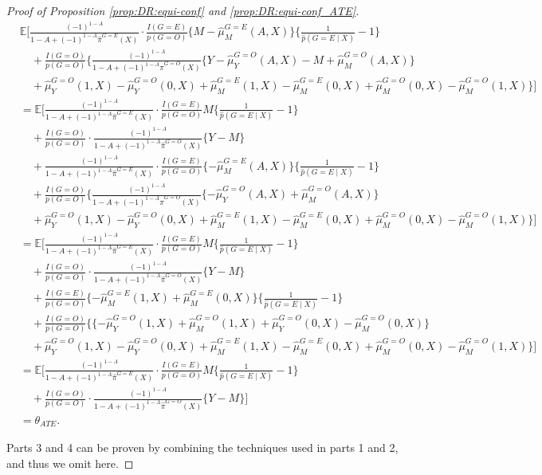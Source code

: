\documentclass[10pt]{article}
\begin{document}
\begin{proof}[Proof of Proposition \ref{prop:DR:equi-conf} and \ref{prop:DR:equi-conf_ATE}]
\begingroup
\allowdisplaybreaks
\begin{align*}
&\mathbb{E}\Big[
\frac{(-1)^{1-A}}{1-A+(-1)^{1-A}\hat{\pi}^{G=E}(X)}\cdot\frac{I(G=E)}{p(G=O)}
\{M-\hat{\mu}^{G=E}_M(A,X)\}\{\frac{1}{\hat{p}(G=E\mid X)}-1\}\\
&\quad+\frac{I(G=O)}{p(G=O)}\big\{
\frac{(-1)^{1-A}}{1-A+(-1)^{1-A}\hat{\pi}^{G=O}(X)}\{Y-\hat{\mu}^{G=O}_Y(A,X)-M+\hat{\mu}^{G=O}_M(A,X)\}\\
&\quad+
\hat{\mu}^{G=O}_Y(1,X)-\hat{\mu}^{G=O}_Y(0,X)
+\hat{\mu}^{G=E}_M(1,X)-\hat{\mu}^{G=E}_M(0,X)
+\hat{\mu}^{G=O}_M(0,X)-\hat{\mu}^{G=O}_M(1,X)
\big\}
\Big]\\
&=\mathbb{E}\Big[
\frac{(-1)^{1-A}}{1-A+(-1)^{1-A}\hat{\pi}^{G=E}(X)}\cdot\frac{I(G=E)}{p(G=O)}
M\{\frac{1}{\hat{p}(G=E\mid X)}-1\}\\
&\quad+\frac{I(G=O)}{p(G=O)}\cdot
\frac{(-1)^{1-A}}{1-A+(-1)^{1-A}\hat{\pi}^{G=O}(X)}\{Y-M\}\\
&\quad+\frac{(-1)^{1-A}}{1-A+(-1)^{1-A}\hat{\pi}^{G=E}(X)}\cdot\frac{I(G=E)}{p(G=O)}
\{-\hat{\mu}^{G=E}_M(A,X)\}\{\frac{1}{\hat{p}(G=E\mid X)}-1\}\\
&\quad+\frac{I(G=O)}{p(G=O)}\big\{
\frac{(-1)^{1-A}}{1-A+(-1)^{1-A}\hat{\pi}^{G=O}(X)}\{-\hat{\mu}^{G=O}_Y(A,X)+\hat{\mu}^{G=O}_M(A,X)\}\\
&\quad+
\hat{\mu}^{G=O}_Y(1,X)-\hat{\mu}^{G=O}_Y(0,X)
+\hat{\mu}^{G=E}_M(1,X)-\hat{\mu}^{G=E}_M(0,X)
+\hat{\mu}^{G=O}_M(0,X)-\hat{\mu}^{G=O}_M(1,X)
\big\}
\Big]\\
&=\mathbb{E}\Big[
\frac{(-1)^{1-A}}{1-A+(-1)^{1-A}\hat{\pi}^{G=E}(X)}\cdot\frac{I(G=E)}{p(G=O)}
M\{\frac{1}{\hat{p}(G=E\mid X)}-1\}\\
&\quad+\frac{I(G=O)}{p(G=O)}\cdot
\frac{(-1)^{1-A}}{1-A+(-1)^{1-A}\hat{\pi}^{G=O}(X)}\{Y-M\}\\
&\quad+\frac{I(G=E)}{p(G=O)}
\{-\hat{\mu}^{G=E}_M(1,X)+\hat{\mu}^{G=E}_M(0,X)\}\{\frac{1}{\hat{p}(G=E\mid X)}-1\}\\
&\quad+\frac{I(G=O)}{p(G=O)}\big\{
\{-\hat{\mu}^{G=O}_Y(1,X)+\hat{\mu}^{G=O}_M(1,X)+\hat{\mu}^{G=O}_Y(0,X)-\hat{\mu}^{G=O}_M(0,X)\}\\
&\quad+
\hat{\mu}^{G=O}_Y(1,X)-\hat{\mu}^{G=O}_Y(0,X)
+\hat{\mu}^{G=E}_M(1,X)-\hat{\mu}^{G=E}_M(0,X)
+\hat{\mu}^{G=O}_M(0,X)-\hat{\mu}^{G=O}_M(1,X)
\big\}
\Big]\\
&=\mathbb{E}\Big[
\frac{(-1)^{1-A}}{1-A+(-1)^{1-A}\hat{\pi}^{G=E}(X)}\cdot\frac{I(G=E)}{p(G=O)}
M\{\frac{1}{\hat{p}(G=E\mid X)}-1\}\\
&\quad+\frac{I(G=O)}{p(G=O)}\cdot
\frac{(-1)^{1-A}}{1-A+(-1)^{1-A}\hat{\pi}^{G=O}(X)}\{Y-M\}
\Big]\\
&=\theta_{ATE}.
\end{align*}
\endgroup

Parts 3 and 4 can be proven by combining the techniques used in parts 1 and 2, and thus we omit here.


\end{proof}
\end{document}
